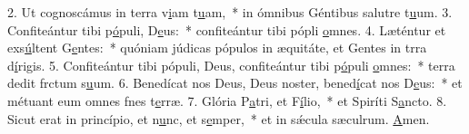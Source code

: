 2. Ut cognoscámus in terra v\uline{i}am t\uline{u}am,~* in ómnibus Géntibus salutre t\uline{u}um.
3. Confiteántur tibi p\uline{ó}puli, D\uline{e}us:~* confiteántur tibi pópli \uline{o}mnes.
4. Læténtur et exs\uline{ú}ltent G\uline{e}ntes:~* quóniam júdicas pópulos in æquitáte, et Gentes in trra d\uline{í}rigis.
5. Confiteántur tibi pópuli, Deus, confiteántur tibi p\uline{ó}puli \uline{o}mnes:~* terra dedit frctum s\uline{u}um.
6. Benedícat nos Deus, Deus noster, bened\uline{í}cat nos D\uline{e}us:~* et métuant eum omnes fnes t\uline{e}rræ.
7. Glória P\uline{a}tri, et F\uline{í}lio,~* et Spiríti S\uline{a}ncto.
8. Sicut erat in princípio, et n\uline{u}nc, et s\uline{e}mper,~* et in sǽcula sæculrum. \uline{A}men.
